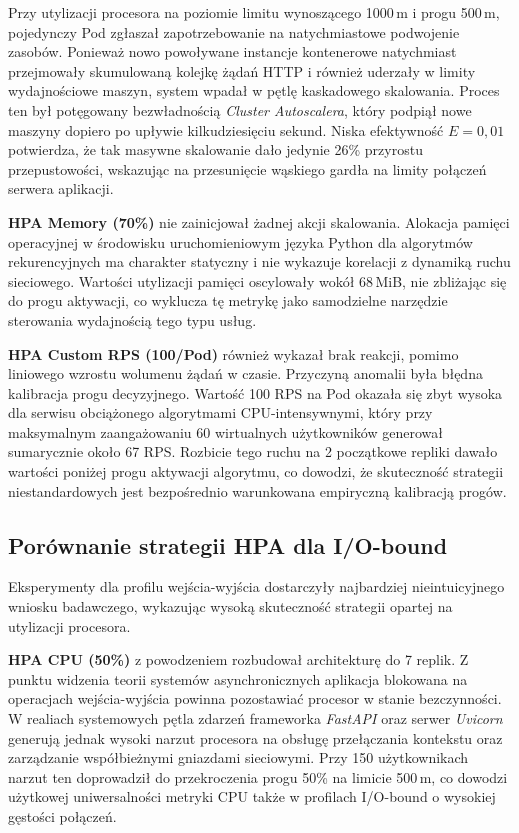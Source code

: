 Przy utylizacji procesora na poziomie limitu wynoszącego 1000\,m i progu 500\,m, pojedynczy Pod zgłaszał zapotrzebowanie na natychmiastowe podwojenie zasobów. Ponieważ nowo powoływane instancje kontenerowe natychmiast przejmowały skumulowaną kolejkę żądań HTTP i również uderzały w limity wydajnościowe maszyn, system wpadał w pętlę kaskadowego skalowania. Proces ten był potęgowany bezwładnością \textit{Cluster Autoscalera}, który podpiął nowe maszyny dopiero po upływie kilkudziesięciu sekund. Niska efektywność $E = 0{,}01$ potwierdza, że tak masywne skalowanie dało jedynie 26\% przyrostu przepustowości, wskazując na przesunięcie wąskiego gardła na limity połączeń serwera aplikacji.

\textbf{HPA Memory (70\%)} nie zainicjował żadnej akcji skalowania. Alokacja pamięci operacyjnej w środowisku uruchomieniowym języka Python dla algorytmów rekurencyjnych ma charakter statyczny i nie wykazuje korelacji z dynamiką ruchu sieciowego. Wartości utylizacji pamięci oscylowały wokół 68\,MiB, nie zbliżając się do progu aktywacji, co wyklucza tę metrykę jako samodzielne narzędzie sterowania wydajnością tego typu usług.

\textbf{HPA Custom RPS (100/Pod)} również wykazał brak reakcji, pomimo liniowego wzrostu wolumenu żądań w czasie. Przyczyną anomalii była błędna kalibracja progu decyzyjnego. Wartość 100 RPS na Pod okazała się zbyt wysoka dla serwisu obciążonego algorytmami CPU-intensywnymi, który przy maksymalnym zaangażowaniu 60 wirtualnych użytkowników generował sumarycznie około 67 RPS. Rozbicie tego ruchu na 2 początkowe repliki dawało wartości poniżej progu aktywacji algorytmu, co dowodzi, że skuteczność strategii niestandardowych jest bezpośrednio warunkowana empiryczną kalibracją progów.

\subsection{Porównanie strategii HPA dla I/O-bound}

Eksperymenty dla profilu wejścia-wyjścia dostarczyły najbardziej nieintuicyjnego wniosku badawczego, wykazując wysoką skuteczność strategii opartej na utylizacji procesora.

\textbf{HPA CPU (50\%)} z powodzeniem rozbudował architekturę do 7 replik. Z punktu widzenia teorii systemów asynchronicznych aplikacja blokowana na operacjach wejścia-wyjścia powinna pozostawiać procesor w stanie bezczynności. W realiach systemowych pętla zdarzeń frameworka \textit{FastAPI} oraz serwer \textit{Uvicorn} generują jednak wysoki narzut procesora na obsługę przełączania kontekstu oraz zarządzanie współbieżnymi gniazdami sieciowymi. Przy 150 użytkownikach narzut ten doprowadził do przekroczenia progu 50\% na limicie 500\,m, co dowodzi użytkowej uniwersalności metryki CPU także w profilach I/O-bound o wysokiej gęstości połączeń.

